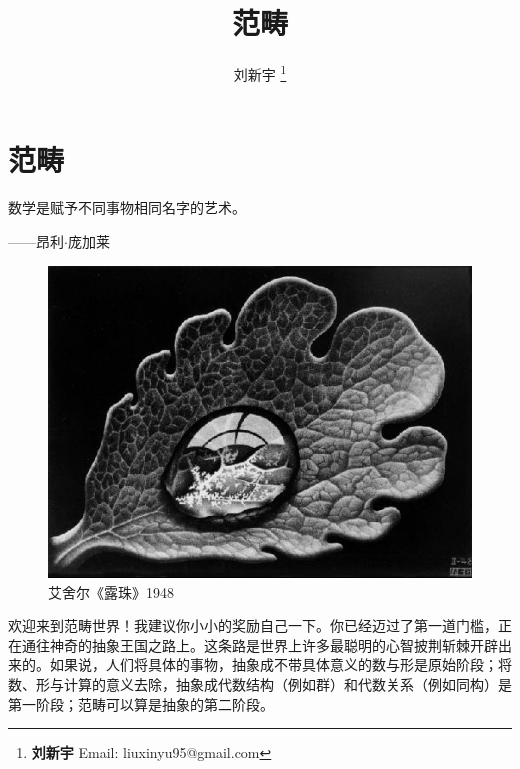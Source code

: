 \documentclass[b5paper]{ctexart}
\begin{document}
\title{范畴}

\author{刘新宇
\thanks{{\bfseries 刘新宇} \newline
  Email: liuxinyu95@gmail.com \newline}
  }

\maketitle
\fi


\ifx\wholebook\relax
\chapter{范畴}
\fi

\epigraph{数学是赋予不同事物相同名字的艺术。}{——昂利$\cdot$庞加莱}


\begin{figure}
 \centering
 \includegraphics[scale=0.5]{img/dewdrop.jpg}
 \captionsetup{labelformat=empty}
 \caption{艾舍尔《露珠》1948}
 \label{fig:Escher-Dewdrop-1948}
\end{figure}

欢迎来到范畴世界！我建议你小小的奖励自己一下。你已经迈过了第一道门槛，正在通往神奇的抽象王国之路上。这条路是世界上许多最聪明的心智披荆斩棘开辟出来的。如果说，人们将具体的事物，抽象成不带具体意义的数与形是原始阶段；将数、形与计算的意义去除，抽象成代数结构（例如群）和代数关系（例如同构）是第一阶段；范畴可以算是抽象的第二阶段。
\end{document}
